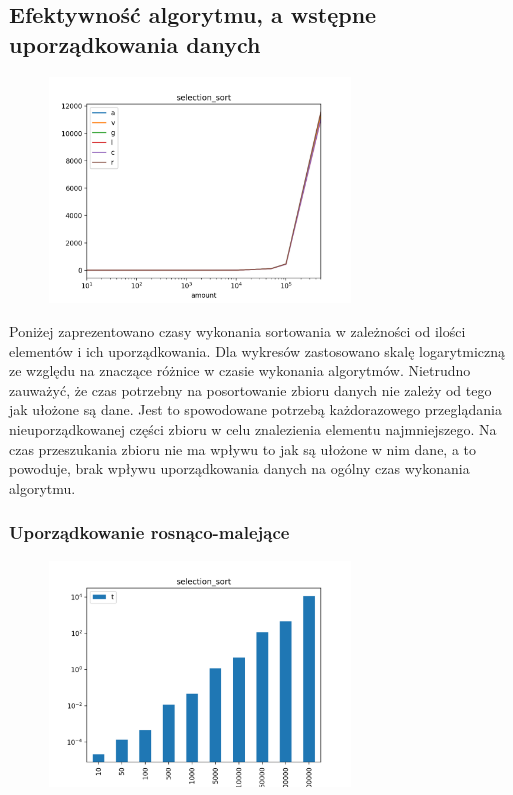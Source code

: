 \documentclass[]{article}
\begin{document}
	\subsection{Efektywność algorytmu, a wstępne uporządkowania danych}
		\begin{figure}[H]
			\centering
			\includegraphics[width=8cm]{selection_sort_gather.png}	
		\end{figure}
		Poniżej zaprezentowano czasy wykonania sortowania w zależności od ilości elementów i ich uporządkowania. Dla wykresów zastosowano skalę logarytmiczną ze względu na znaczące różnice w czasie wykonania algorytmów. Nietrudno zauważyć, że czas potrzebny na posortowanie zbioru danych nie zależy od tego jak ułożone są dane. Jest to spowodowane potrzebą każdorazowego przeglądania nieuporządkowanej części zbioru w celu znalezienia elementu najmniejszego. Na czas przeszukania zbioru nie ma wpływu to jak są ułożone w nim dane, a to powoduje, brak wpływu uporządkowania danych na ogólny czas wykonania algorytmu.
		\subsubsection{Uporządkowanie rosnąco-malejące}
			\begin{figure}[H]
				\centering
				\includegraphics[width=8cm]{selection_sort_a.png}	
			\end{figure}
\end{document}
